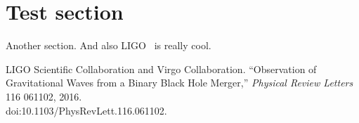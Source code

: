 \documentclass[12pt]{article}
\begin{document}
\section{Test section}
\label{sec:testref}

Another section.  And also LIGO~\cite{Ligo2016} is really cool.


\begin{thebibliography}{99}
 {LIGO Scientific Collaboration and Virgo
    Collaboration.}  ``Observation of Gravitational Waves from a Binary Black
  Hole Merger,'' \emph{Physical Review Letters} {116} {061102}, {2016}.
  \\
  doi:{10.1103/PhysRevLett.116.061102}.
\end{thebibliography}
\end{document}
